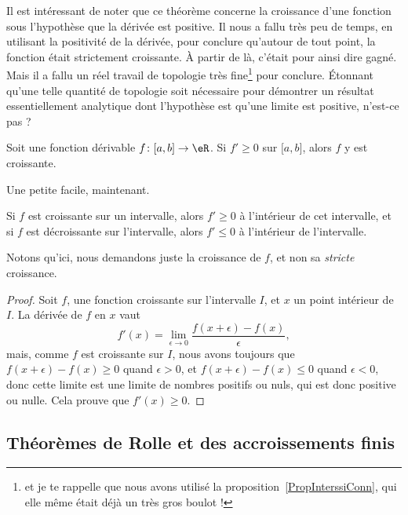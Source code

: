 Il est intéressant de noter que ce théorème concerne la croissance d'une fonction sous l'hypothèse que la dérivée est positive. Il nous a fallu très peu de temps, en utilisant la positivité de la dérivée, pour conclure qu'autour de tout point, la fonction était strictement croissante. À partir de là, c'était pour ainsi dire gagné. Mais il a fallu un réel travail de topologie très fine\footnote{et je te rappelle que nous avons utilisé la proposition~\ref{PropInterssiConn}, qui elle même était déjà un très gros boulot !} pour conclure. Étonnant qu'une telle quantité de topologie soit nécessaire pour démontrer un résultat essentiellement analytique dont l'hypothèse est qu'une limite est positive, n'est-ce pas ?


\begin{proposition}     \label{PROPooRJRUooOtIKrO}
    Soit une fonction dérivable \( f\colon \mathopen[ a , b \mathclose]\to \eR\). Si \( f'\geq 0\) sur \( \mathopen[ a , b \mathclose]\), alors \( f\) y est croissante.
\end{proposition}

Une petite facile, maintenant.
\begin{proposition}
	Si \( f\) est croissante sur un intervalle, alors \( f'\geq 0\) à l'intérieur de cet intervalle, et si \( f\) est décroissante sur l'intervalle, alors \( f'\leq 0\) à l'intérieur de l'intervalle.
\end{proposition}

Notons qu'ici, nous demandons juste la croissance de \( f\), et non sa \emph{stricte} croissance.

\begin{proof}
	Soit \( f\), une fonction croissante sur l'intervalle \( I\), et \( x\) un point intérieur de \( I\). La dérivée de \( f\) en \( x\) vaut
	\begin{equation}
		f'(x)=\lim_{\epsilon\to 0}\frac{ f(x+\epsilon)-f(x) }{\epsilon},
	\end{equation}
	mais, comme \( f\) est croissante sur \( I\), nous avons toujours que \( f(x+\epsilon)-f(x)\geq0\) quand \( \epsilon>0\), et \( f(x+\epsilon)-f(x)\leq0\) quand \( \epsilon<0\), donc cette limite est une limite de nombres positifs ou nuls, qui est donc positive ou nulle. Cela prouve que \( f'(x)\geq 0\).
\end{proof}

\subsection{Théorèmes de Rolle et des accroissements finis}

